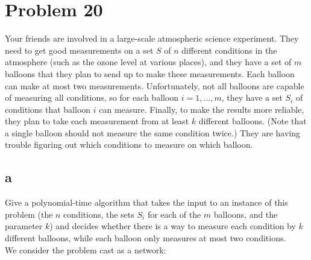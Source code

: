 \documentclass{amsart}
\theoremstyle{definition}
\theoremstyle{remark}
\numberwithin{equation}{section}
\begin{document}
\section{Problem 20}
Your friends are involved in a large-scale atmospheric science experiment. They need to get good measurements on a set $S$ of $n$ different conditions in the atmosphere (such as the ozone level at various places), and they have a set of $m$ balloons that they plan to send up to make these measurements. Each balloon can make at most two measurements.
Unfortunately, not all balloons are capable of measuring all conditions, so for each balloon $i = 1, \ldots , m$, they have a set $S_i$ of conditions that balloon $i$ can measure. Finally, to make the results more reliable, they plan to take each measurement from at least $k$ different balloons. (Note that a single balloon should not measure the same condition twice.) They are having trouble figuring out which conditions to measure on which balloon.

\subsection*{a}
Give a polynomial-time algorithm that takes the input to an instance of this problem (the $n$ conditions, the sets $S_i$ for each of the $m$ balloons, and the parameter $k$) and decides whether there is a way to measure each condition by $k$ different balloons, while each balloon only measures at most two conditions. \\

We consider the problem cast as a network:
\end{document}
